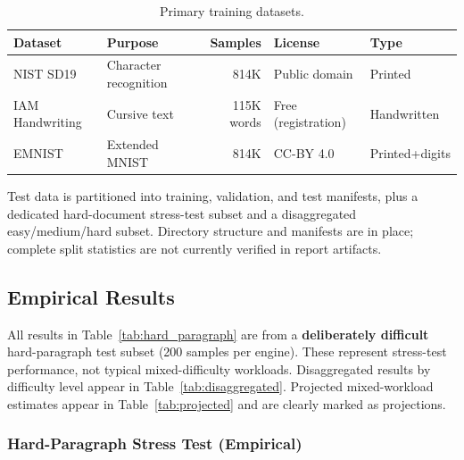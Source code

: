 \documentclass[12pt,a4paper]{article}
\begin{document}
\begin{table}[H]
  \centering
  \small
  \begin{tabular}{llrll}
    \toprule
    \textbf{Dataset} & \textbf{Purpose} & \textbf{Samples}
    & \textbf{License} & \textbf{Type} \\
    \midrule
    NIST SD19 & Character recognition & 814K & Public domain
    & Printed \\
    IAM Handwriting & Cursive text & 115K words
    & Free (registration) & Handwritten \\
    EMNIST & Extended MNIST & 814K & CC-BY 4.0
    & Printed+digits \\
    \bottomrule
  \end{tabular}
  \caption{Primary training datasets.}
\end{table}

Test data is partitioned into training, validation, and test
manifests, plus a dedicated hard-document stress-test subset and a
disaggregated easy/medium/hard subset. Directory structure and
manifests are in place; complete split statistics are not currently
verified in report artifacts.

\subsection{Empirical Results}

\begin{tcolorbox}[colback=yellow!5!white, colframe=yellow!50!black,
    title=Interpretation Note]
  All results in Table~\ref{tab:hard_paragraph} are from a
  \textbf{deliberately difficult} hard-paragraph test subset (200
  samples per engine). These represent stress-test performance, not
  typical mixed-difficulty workloads. Disaggregated results by
  difficulty level appear in Table~\ref{tab:disaggregated}.
  Projected mixed-workload estimates appear in
  Table~\ref{tab:projected} and are clearly marked as projections.
\end{tcolorbox}

\subsubsection{Hard-Paragraph Stress Test (Empirical)}
\end{document}
